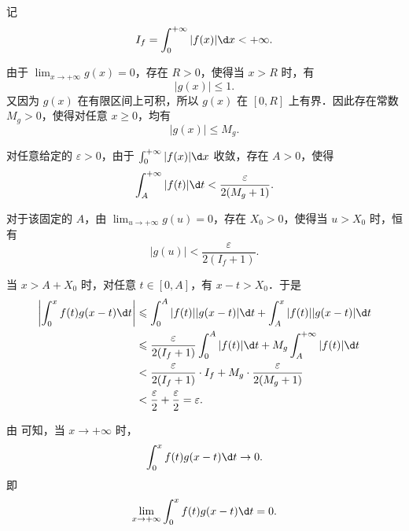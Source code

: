 \begin{myproof}
    记
    \begin{equation}
        I_f = \int_0^{+\infty} |f(x)| \d x < +\infty.
    \end{equation}

    由于 $\lim_{x\to+\infty} g(x)=0$，存在 $R>0$，使得当 $x>R$ 时，有
    \begin{equation}
        |g(x)| \leqslant 1.
    \end{equation}
    又因为 $g(x)$ 在有限区间上可积，所以 $g(x)$ 在 $[0,R]$ 上有界．因此存在常数 $M_g>0$，使得对任意 $x\geqslant 0$，均有
    \begin{equation}
        |g(x)| \leqslant M_g.
    \end{equation}

    对任意给定的 $\varepsilon>0$，由于 $\int_0^{+\infty}|f(x)|\d x$ 收敛，存在 $A>0$，使得
    \begin{equation}
        \int_A^{+\infty}|f(t)|\d t < \frac{\varepsilon}{2(M_g+1)}.
    \end{equation}

    对于该固定的 $A$，由 $\lim_{u\to+\infty}g(u)=0$，存在 $X_0>0$，使得当 $u>X_0$ 时，恒有
    \begin{equation}
        |g(u)| < \frac{\varepsilon}{2(I_f+1)}.
    \end{equation}

    当 $x>A+X_0$ 时，对任意 $t\in[0,A]$，有 $x-t>X_0$．于是
    \begin{equation}
        \begin{aligned}
            \left| \int_0^x f(t)g(x-t)\d t \right|
             & \leqslant \int_0^A |f(t)||g(x-t)|\d t
            + \int_A^x |f(t)||g(x-t)|\d t                                \\
             & \leqslant \frac{\varepsilon}{2(I_f+1)}\int_0^A |f(t)|\d t
            + M_g\int_A^{+\infty}|f(t)|\d t                              \\
             & < \frac{\varepsilon}{2(I_f+1)}\cdot I_f
            + M_g\cdot \frac{\varepsilon}{2(M_g+1)}                      \\
             & < \frac{\varepsilon}{2}+\frac{\varepsilon}{2}
            = \varepsilon.
        \end{aligned}
        \label{eq:convolution-estimate}
    \end{equation}

    由  可知，当 $x\to+\infty$ 时，
    \begin{equation}
        \int_0^x f(t)g(x-t)\d t \to 0.
    \end{equation}
    即
    \begin{equation}
        \lim_{x\to+\infty}\int_0^x f(t)g(x-t)\d t=0.
    \end{equation}
\end{myproof}

\endinput
